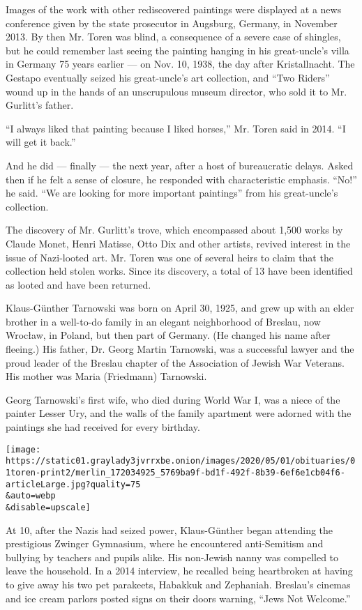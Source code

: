 Images of the work with other rediscovered paintings were displayed at a
news conference given by the state prosecutor in Augsburg, Germany, in
November 2013. By then Mr. Toren was blind, a consequence of a severe
case of shingles, but he could remember last seeing the painting hanging
in his great-uncle's villa in Germany 75 years earlier --- on Nov. 10,
1938, the day after Kristallnacht. The Gestapo eventually seized his
great-uncle's art collection, and ``Two Riders'' wound up in the hands
of an unscrupulous museum director, who sold it to Mr. Gurlitt's father.

``I always liked that painting because I liked horses,'' Mr. Toren said
in 2014. ``I will get it back.''

And he did --- finally --- the next year, after a host of bureaucratic
delays. Asked then if he felt a sense of closure, he responded with
characteristic emphasis. ``No!'' he said. ``We are looking for more
important paintings'' from his great-uncle's collection.

The discovery of Mr. Gurlitt's trove, which encompassed about 1,500
works by Claude Monet, Henri Matisse, Otto Dix and other artists,
revived interest in the issue of Nazi-looted art. Mr. Toren was one of
several heirs to claim that the collection held stolen works. Since its
discovery, a total of 13 have been identified as looted and have been
returned.

Klaus-Günther Tarnowski was born on April 30, 1925, and grew up with an
elder brother in a well-to-do family in an elegant neighborhood of
Breslau, now Wrocław, in Poland, but then part of Germany. (He changed
his name after fleeing.) His father, Dr. Georg Martin Tarnowski, was a
successful lawyer and the proud leader of the Breslau chapter of the
Association of Jewish War Veterans. His mother was Maria (Friedmann)
Tarnowski.

Georg Tarnowski's first wife, who died during World War I, was a niece
of the painter Lesser Ury, and the walls of the family apartment were
adorned with the paintings she had received for every birthday.

\texttt{[image: https://static01.graylady3jvrrxbe.onion/images/2020/05/01/obituaries/01toren-print2/merlin\_172034925\_5769ba9f-bd1f-492f-8b39-6ef6e1cb04f6-articleLarge.jpg?quality=75\\\&auto=webp\\\&disable=upscale]}

At 10, after the Nazis had seized power, Klaus-Günther began attending
the prestigious Zwinger Gymnasium, where he encountered anti-Semitism
and bullying by teachers and pupils alike. His non-Jewish nanny was
compelled to leave the household. In a 2014 interview, he recalled being
heartbroken at having to give away his two pet parakeets, Habakkuk and
Zephaniah. Breslau's cinemas and ice cream parlors posted signs on their
doors warning, ``Jews Not Welcome.''

